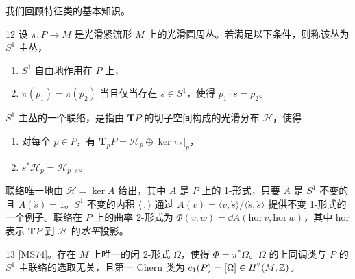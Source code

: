 我们回顾特征类的基本知识。

\begin{defn}{12}
设 $\pi:P\longrightarrow M$ 是光滑紧流形 $M$ 上的光滑圆周丛。若满足以下条件，则称该丛为 $S^1$ 主丛，
\begin{enumerate}[leftmargin=1.8em,itemsep=2pt,topsep=2pt]
\item $S^1$ 自由地作用在 $P$ 上，
\item $\pi(p_1)=\pi(p_2)$ 当且仅当存在 $s\in S^1$，使得 $p_1\cdot s=p_2$。
\end{enumerate}
$S^1$ 主丛的一个联络，是指由 $\mathbf{T}P$ 的切子空间构成的光滑分布 $\mathcal{H}$，使得
\begin{enumerate}[leftmargin=1.8em,itemsep=2pt,topsep=2pt]
\item 对每个 $p\in P$，有 $\mathbf{T}_pP=\mathcal{H}_p\oplus\ker\pi_*|_p$，
\item $s^*\mathcal{H}_p=\mathcal{H}_{p\cdot s}$。
\end{enumerate}

联络唯一地由 $\mathcal{H}=\ker A$ 给出，其中 $A$ 是 $P$ 上的 1-形式，只要 $A$ 是 $S^1$ 不变的且 $A(\dot{s})=1$。$S^1$ 不变的内积 $\langle\,,\rangle$ 通过 $A(v)=\langle v,\dot{s}\rangle/\langle\dot{s},\dot{s}\rangle$ 提供不变 1-形式的一个例子。联络在 $P$ 上的曲率 2-形式为 $\Phi(v,w)=\dd A(\mathrm{hor}\,v,\mathrm{hor}\,w)$，其中 hor 表示 $\mathbf{T}P$ 到 $\mathcal{H}$ 的\emph{水平}投影。
\end{defn}

\begin{thm}{13} [MS74]。存在 $M$ 上唯一的闭 2-形式 $\Omega$，使得 $\Phi=\pi^*\Omega$。$\Omega$ 的上同调类与 $P$ 的 $S^1$ 主联络的选取无关，且第一 Chern 类为 $c_1(P)=[\Omega]\in H^2(M,\mathbb{Z})$。\end{thm}


